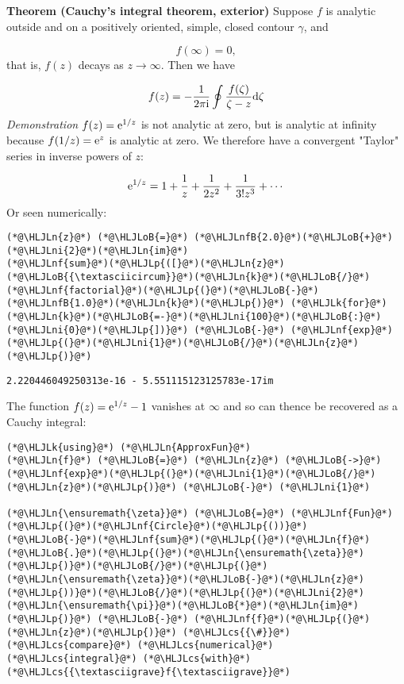 \documentclass[12pt,a4paper]{article}
\newcommand{\HLJLk}[1]{\textcolor[RGB]{148,91,176}{\textbf{#1}}}
\newcommand{\HLJLn}[1]{#1}
\newcommand{\HLJLnf}[1]{\textcolor[RGB]{66,102,213}{#1}}
\newcommand{\HLJLnfB}[1]{\textcolor[RGB]{59,151,46}{#1}}
\newcommand{\HLJLni}[1]{\textcolor[RGB]{59,151,46}{#1}}
\newcommand{\HLJLoB}[1]{\textcolor[RGB]{102,102,102}{\textbf{#1}}}
\newcommand{\HLJLp}[1]{#1}
\newcommand{\HLJLcs}[1]{\textcolor[RGB]{153,153,119}{\textit{#1}}}
\def\D{ {\rm d} }
\def\I{ {\rm i} }
\def\E{ {\rm e} }
\begin{document}
\textbf{Theorem (Cauchy's integral theorem, exterior)} Suppose $f$ is analytic outside and on a positively oriented, simple, closed contour $\gamma$, and

\[
f(\infty) = 0,
\]
that is, $f(z)$ decays as $z \rightarrow \infty$. Then we have

\[
f(z) = -{1 \over 2 \pi \I} \oint {f(\zeta) \over \zeta - z} \D \zeta
\]
\emph{Demonstration} $f(z) = \E^{1/z}$ is not analytic at zero, but is analytic at infinity because $f(1/z) = \E^z$ is analytic at zero. We therefore have a convergent "Taylor" series in inverse powers of $z$:

\[
\E^{1/z} = 1 + {1 \over z} + {1 \over 2 z^2} + {1 \over 3! z^3} + \cdots
\]
Or seen numerically:


\begin{lstlisting}
(*@\HLJLn{z}@*) (*@\HLJLoB{=}@*) (*@\HLJLnfB{2.0}@*)(*@\HLJLoB{+}@*)(*@\HLJLni{2}@*)(*@\HLJLn{im}@*)
(*@\HLJLnf{sum}@*)(*@\HLJLp{([}@*)(*@\HLJLn{z}@*)(*@\HLJLoB{{\textasciicircum}}@*)(*@\HLJLn{k}@*)(*@\HLJLoB{/}@*)(*@\HLJLnf{factorial}@*)(*@\HLJLp{(}@*)(*@\HLJLoB{-}@*)(*@\HLJLnfB{1.0}@*)(*@\HLJLn{k}@*)(*@\HLJLp{)}@*) (*@\HLJLk{for}@*) (*@\HLJLn{k}@*)(*@\HLJLoB{=-}@*)(*@\HLJLni{100}@*)(*@\HLJLoB{:}@*)(*@\HLJLni{0}@*)(*@\HLJLp{])}@*) (*@\HLJLoB{-}@*) (*@\HLJLnf{exp}@*)(*@\HLJLp{(}@*)(*@\HLJLni{1}@*)(*@\HLJLoB{/}@*)(*@\HLJLn{z}@*)(*@\HLJLp{)}@*)
\end{lstlisting}

\begin{lstlisting}
2.220446049250313e-16 - 5.551115123125783e-17im
\end{lstlisting}


The function $f(z) = \E^{1/z} - 1$ vanishes at $\infty$ and so can thence be recovered as a Cauchy integral:


\begin{lstlisting}
(*@\HLJLk{using}@*) (*@\HLJLn{ApproxFun}@*)
(*@\HLJLn{f}@*) (*@\HLJLoB{=}@*) (*@\HLJLn{z}@*) (*@\HLJLoB{->}@*) (*@\HLJLnf{exp}@*)(*@\HLJLp{(}@*)(*@\HLJLni{1}@*)(*@\HLJLoB{/}@*)(*@\HLJLn{z}@*)(*@\HLJLp{)}@*) (*@\HLJLoB{-}@*) (*@\HLJLni{1}@*)

(*@\HLJLn{\ensuremath{\zeta}}@*) (*@\HLJLoB{=}@*) (*@\HLJLnf{Fun}@*)(*@\HLJLp{(}@*)(*@\HLJLnf{Circle}@*)(*@\HLJLp{())}@*)
(*@\HLJLoB{-}@*)(*@\HLJLnf{sum}@*)(*@\HLJLp{(}@*)(*@\HLJLn{f}@*)(*@\HLJLoB{.}@*)(*@\HLJLp{(}@*)(*@\HLJLn{\ensuremath{\zeta}}@*)(*@\HLJLp{)}@*)(*@\HLJLoB{/}@*)(*@\HLJLp{(}@*)(*@\HLJLn{\ensuremath{\zeta}}@*)(*@\HLJLoB{-}@*)(*@\HLJLn{z}@*)(*@\HLJLp{))}@*)(*@\HLJLoB{/}@*)(*@\HLJLp{(}@*)(*@\HLJLni{2}@*)(*@\HLJLn{\ensuremath{\pi}}@*)(*@\HLJLoB{*}@*)(*@\HLJLn{im}@*)(*@\HLJLp{)}@*) (*@\HLJLoB{-}@*) (*@\HLJLnf{f}@*)(*@\HLJLp{(}@*)(*@\HLJLn{z}@*)(*@\HLJLp{)}@*) (*@\HLJLcs{{\#}}@*) (*@\HLJLcs{compare}@*) (*@\HLJLcs{numerical}@*) (*@\HLJLcs{integral}@*) (*@\HLJLcs{with}@*) (*@\HLJLcs{{\textasciigrave}f{\textasciigrave}}@*)
\end{lstlisting}
\end{document}
